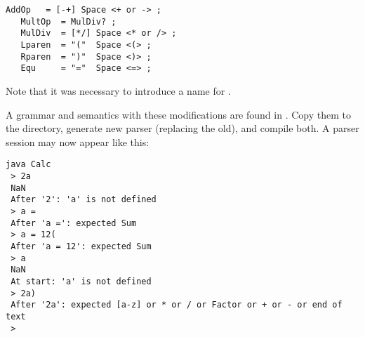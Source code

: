 \small
\begin{Verbatim}[frame=single,framesep=2mm,samepage=true,xleftmargin=15mm,xrightmargin=15mm,baselinestretch=0.8]
   AddOp   = [-+] Space <+ or -> ;
   MultOp  = MulDiv? ;
   MulDiv  = [*/] Space <* or /> ;
   Lparen  = "("  Space <(> ;
   Rparen  = ")"  Space <)> ;
   Equ     = "="  Space <=> ;
\end{Verbatim}
\normalsize

Note that it was necessary to introduce a name for \tx{[*/]}.

A grammar and semantics with these modifications are found in .
Copy them to the  directory, generate new parser (replacing the old), and compile both.
A parser session may now appear like this:

\small
\begin{Verbatim}[samepage=true,xleftmargin=15mm,baselinestretch=0.8]
 java Calc
 > 2a
 NaN
 After '2': 'a' is not defined
 > a =
 After 'a =': expected Sum 
 > a = 12(
 After 'a = 12': expected Sum
 > a
 NaN
 At start: 'a' is not defined 
 > 2a)
 After '2a': expected [a-z] or * or / or Factor or + or - or end of text
 >
\end{Verbatim}
\normalsize


